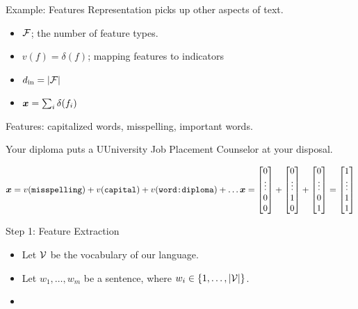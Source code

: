 \documentclass{beamer}
\begin{document}
\begin{frame}{Example: Features}
  Representation picks up other aspects of text.
  \begin{itemize}
  \item $\mathcal{F}$; the number of feature types.
  \item $v(f) = \delta(f)$; mapping features to indicators
  \item $d_{\mathrm{in}} = |\mathcal{F}|$
  \item $\boldsymbol{x} = \sum_{i} \delta(f_i)$ 
  \end{itemize}

  Features: capitalized words, misspelling, important words. 

  Your diploma puts a UUniversity Job Placement Counselor at your disposal.

  \[  \boldx = v(\texttt{misspelling}) + v(\texttt{capital}) + v(\texttt{word:diploma}) + \ldots

  \boldx = 
  \left[ \begin{matrix} 0 \\ \vdots \\ 0\\  0 \\  \end{matrix} \right] + 
  \left[ \begin{matrix} 0 \\ \vdots \\ 1\\ 0 \\  \end{matrix} \right] +
  \left[ \begin{matrix} 0 \\ \vdots \\ 0\\  1 \\  \end{matrix} \right] = 
  \left[ \begin{matrix} 1 \\ \vdots \\ 1 \\ 1 \\  \end{matrix} \right]
  \]
\end{frame}


\begin{frame}{Step 1: Feature Extraction}
  \begin{itemize}
  \item Let $\mathcal{V}$ be the vocabulary of our language.  
  \item  Let $w_1, \ldots, w_m$ be a sentence, where 
    $w_i \in \{1,\ldots, |\mathcal{V}|\}$.
  \item 
  \end{itemize}
\end{frame}
\end{document}
